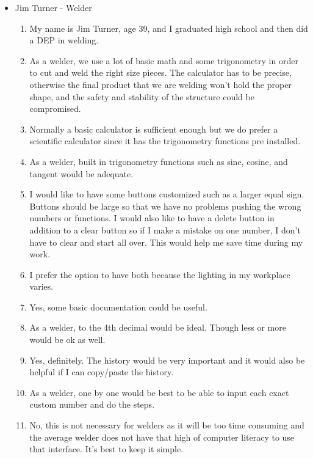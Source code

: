 \documentclass[titlepage]{article}
\begin{document}
\begin{itemize}
\begin{enumerate}
                        \end{enumerate}
                    \item Jim Turner - Welder
                        \begin{enumerate}
                            \item My name is Jim Turner, age 39, and I graduated high school and then did a DEP in welding.
                            \item As a welder, we use a lot of basic math and some trigonometry in order to cut and weld the right size pieces. The calculator has to be precise, otherwise the final product that we are welding won’t hold the proper shape, and the safety and stability of the structure could be compromised.
                            \item Normally a basic calculator is sufficient enough but we do prefer a scientific calculator since it has the trigonometry functions pre installed.
                            \item As a welder, built in trigonometry functions such as sine, cosine, and tangent would be adequate.
                            \item I would like to have some buttons customized such as a larger equal sign. Buttons should be large so that we have no problems pushing the wrong numbers or functions. I would also like to have a delete button in addition to a clear button so if I make a mistake on one number, I don’t have to clear and start all over. This would help me save time during my work.
                            \item I prefer the option to have both because the lighting in my workplace varies.
                            \item Yes, some basic documentation could be useful.
                            \item As a welder, to the 4th decimal would be ideal. Though less or more would be ok as well.
                            \item Yes, definitely. The history would be very important and it would also be helpful if I can copy/paste the history.
                            \item As a welder, one by one would be best to be able to input each exact custom number and do the steps.
                            \item No, this is not necessary for welders as it will be too time consuming and the average welder does not have that high of computer literacy to use that interface. It’s best to keep it simple.

\end{enumerate}
\end{itemize}
\end{document}
